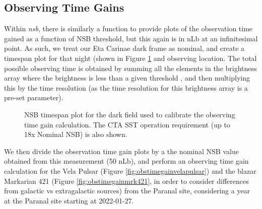 \subsection{Observing Time Gains}
Within \textit{nsb}, there is similarly a function to provide plots of the observation time gained as a function of NSB threshold, but this again is in nLb at an infinitesimal point. As such, we treat our Eta Carinae dark frame as nominal, and create a timespan plot for that night (shown in Figure \ref{fig:timespan_dark} and observing location. The total possible observing time is obtained by summing all the elements in the brightness array where the brightness is less than a given threshold , and then multiplying this by the time resolution (as the time resolution for this brightness array is a pre-set parameter).
\begin{figure}[ht]
\begin{centering}
\caption{NSB timespan plot for the dark field used to calibrate the observing time gain calculation. The CTA SST operation requirement (up to 18x Nominal NSB) is also shown.}
\label{fig:timespan_dark}
\end{centering}
\end{figure}

We then divide the observation time gain plots by a the nominal NSB value obtained from this measurement (50 nLb), and perform an observing time gain calculation for the Vela Pulsar (Figure   \ref{fig:obstimegainvelapulsar}) and the blazar Markarian 421 (Figure \ref{fig:obstimegainmrk421}, in order to consider differences from galactic vs extragalactic sources) from the Paranal site, considering a year at the Paranal site starting at 2022-01-27.

